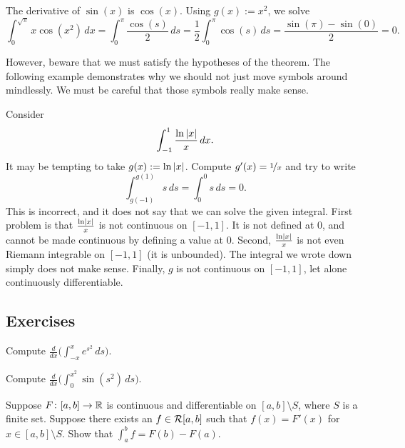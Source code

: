 \begin{example}
The derivative of $\sin(x)$ is $\cos(x)$.
Using $g(x):=x^2$, we solve
\begin{equation*}
\int_0^{\sqrt{\pi}} x \cos(x^2) \, dx = \int_0^\pi \frac{\cos(s)}{2} \, ds
=
\frac{1}{2}
\int_0^\pi \cos(s) \, ds
=
\frac{
\sin(\pi) - \sin(0)
}{2}
=
0 .
\end{equation*}
\end{example}

However, beware that we must satisfy the hypotheses of the theorem.  The
following example demonstrates why we should not just 
move symbols around mindlessly.
We must be careful that those symbols really make sense.

\begin{example}
Consider
\begin{equation*}
\int_{-1}^{1} \frac{\ln \left\lvert {x} \right\rvert}{x} \,dx .
\end{equation*}
It may be tempting to take $g(x) := \ln \left\lvert {x} \right\rvert$.  Compute $g'(x) =
\nicefrac{1}{x}$ and try to write
\begin{equation*}
\int_{g(-1)}^{g(1)} s \,ds = 
\int_{0}^{0} s \,ds = 0. 
\end{equation*}
This  is incorrect, and it does not say
that we can solve the given integral.  First problem is that
$\frac{\ln \left\lvert {x} \right\rvert}{x}$ is not continuous on $[-1,1]$.
It is not defined at 0, and cannot be made continuous by defining a value at
0.
Second, $\frac{\ln \left\lvert {x} \right\rvert}{x}$ is not even Riemann integrable on $[-1,1]$
(it is unbounded).
The integral we wrote down simply does not make sense.
Finally, $g$ is not continuous 
on $[-1,1]$, let alone continuously differentiable.
\end{example}

\subsection{Exercises}

\begin{exercise}
Compute
$\displaystyle
\frac{d}{dx} \biggl( \int_{-x}^x e^{s^2}\,ds \biggr)$.
\end{exercise}

\begin{exercise}
Compute
$\displaystyle
\frac{d}{dx} \biggl( \int_{0}^{x^2} \sin(s^2)\,ds \biggr)$.
\end{exercise}

\begin{exercise}
Suppose $F \colon [a,b] \to {\mathbb{R}}$ is continuous and differentiable
on $[a,b] \setminus S$, where $S$ is a finite set.  Suppose there
exists an $f \in {\mathcal{R}}[a,b]$ such that $f(x) = F'(x)$ for $x \in [a,b]
\setminus S$.  Show that
$\int_a^b f = F(b)-F(a)$.
\end{exercise}

